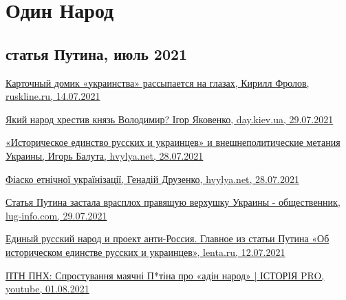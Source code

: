  
 
 
 
 
\chapter{Один Народ}

\section{статья Путина, июль 2021}



\href{https://ruskline.ru/news_rl/2021/07/14/kartochnyi_domik_ukrainstva_rassypaetsya_na_glazah}{%
Карточный домик «украинства» рассыпается на глазах, Кирилл Фролов, ruskline.ru, 14.07.2021%
}

\href{https://day.kyiv.ua/uk/blog/suspilstvo/yakyy-narod-hrestyv-knyaz-volodymyr}{%
Який народ хрестив князь Володимир? Ігор Яковенко, day.kiev.ua, 29.07.2021%
}

\href{https://analytics.hvylya.net/234637-istoricheskoe-edinstvo-russkih-i-ukraincev-i-vneshnepoliticheskie-metaniya-ukrainy}{%
«Историческое единство русских и украинцев» и внешнеполитические метания Украины, Игорь Балута, hvylya.net, 28.07.2021%
}

\href{https://analytics.hvylya.net/234631-fiasko-etnichnoji-ukrajinizaciji}{%
Фіаско етнічної українізації, Генадій Друзенко, hvylya.net, 28.07.2021%
}

\href{https://lug-info.com/news/stat-a-putina-zastala-vrasploh-pravasuu-verhusku-ukrainy-obsestvennik}{%
Статья Путина застала врасплох правящую верхушку Украины - общественник, lug-info.com, 29.07.2021%
}

\href{https://lenta.ru/brief/2021/07/12/odin_narod/}{%
Единый русский народ и проект анти-Россия. Главное из статьи Путина «Об историческом единстве русских и украинцев», %
lenta.ru, 12.07.2021%
}

\href{https://www.youtube.com/watch?v=E2f7VreiQjU}{%
ПТН ПНХ: Спростування маячні П*тіна про «адін народ» | ІСТОРІЯ PRO, youtube, 01.08.2021%
}


